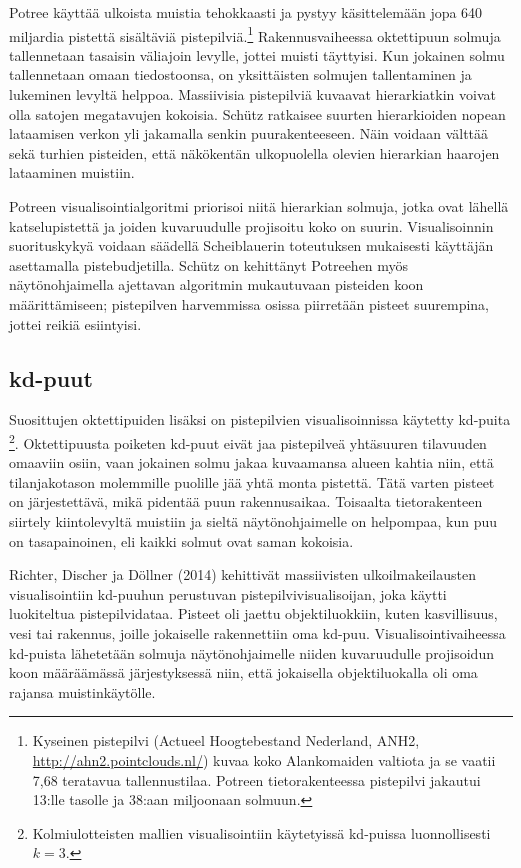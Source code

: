 Potree käyttää ulkoista muistia tehokkaasti ja pystyy käsittelemään jopa 640 miljardia pistettä sisältäviä pistepilviä.\footnote{Kyseinen pistepilvi (Actueel Hoogtebestand Nederland, ANH2, \url{http://ahn2.pointclouds.nl/}) kuvaa koko Alankomaiden valtiota ja se vaatii 7,68 teratavua tallennustilaa. Potreen tietorakenteessa pistepilvi jakautui 13:lle tasolle ja 38:aan miljoonaan solmuun.} Rakennusvaiheessa oktettipuun solmuja tallennetaan tasaisin väliajoin levylle, jottei muisti täyttyisi. Kun jokainen solmu tallennetaan omaan tiedostoonsa, on yksittäisten solmujen tallentaminen ja lukeminen levyltä helppoa. Massiivisia pistepilviä kuvaavat hierarkiatkin voivat olla satojen megatavujen kokoisia. Schütz ratkaisee suurten hierarkioiden nopean lataamisen verkon yli jakamalla senkin puurakenteeseen. Näin voidaan välttää sekä turhien pisteiden, että näkökentän ulkopuolella olevien hierarkian haarojen lataaminen muistiin. \cite{potree}

Potreen visualisointialgoritmi priorisoi niitä hierarkian solmuja, jotka ovat lähellä katselupistettä ja joiden kuvaruudulle projisoitu koko on suurin. Visualisoinnin suorituskykyä voidaan säädellä Scheiblauerin toteutuksen mukaisesti käyttäjän asettamalla pistebudjetilla. Schütz on kehittänyt Potreehen myös näytönohjaimella ajettavan algoritmin mukautuvaan pisteiden koon määrittämiseen; pistepilven harvemmissa osissa piirretään pisteet suurempina, jottei reikiä esiintyisi. \cite{potree}

\subsection{kd-puut}
Suosittujen oktettipuiden lisäksi on pistepilvien visualisoinnissa käytetty kd-puita \footnote{Kolmiulotteisten mallien visualisointiin käytetyissä kd-puissa luonnollisesti $k=3$.}. Oktettipuusta poiketen kd-puut eivät jaa pistepilveä yhtäsuuren tilavuuden omaaviin osiin, vaan jokainen solmu jakaa kuvaamansa alueen kahtia niin, että tilanjakotason molemmille puolille jää yhtä monta pistettä. Tätä varten pisteet on järjestettävä, mikä pidentää puun rakennusaikaa. Toisaalta tietorakenteen siirtely kiintolevyltä muistiin ja sieltä näytönohjaimelle on helpompaa, kun puu on tasapainoinen, eli kaikki solmut ovat saman kokoisia. \cite{richter}

Richter, Discher ja Döllner (2014) kehittivät massiivisten ulkoilmakeilausten visualisointiin kd-puuhun perustuvan pistepilvivisualisoijan, joka käytti luokiteltua pistepilvidataa. Pisteet oli jaettu objektiluokkiin, kuten kasvillisuus, vesi tai rakennus, joille jokaiselle rakennettiin oma kd-puu. Visualisointivaiheessa kd-puista lähetetään solmuja näytönohjaimelle niiden kuvaruudulle projisoidun koon määräämässä järjestyksessä niin, että jokaisella objektiluokalla oli oma rajansa muistinkäytölle. \cite{richter}

